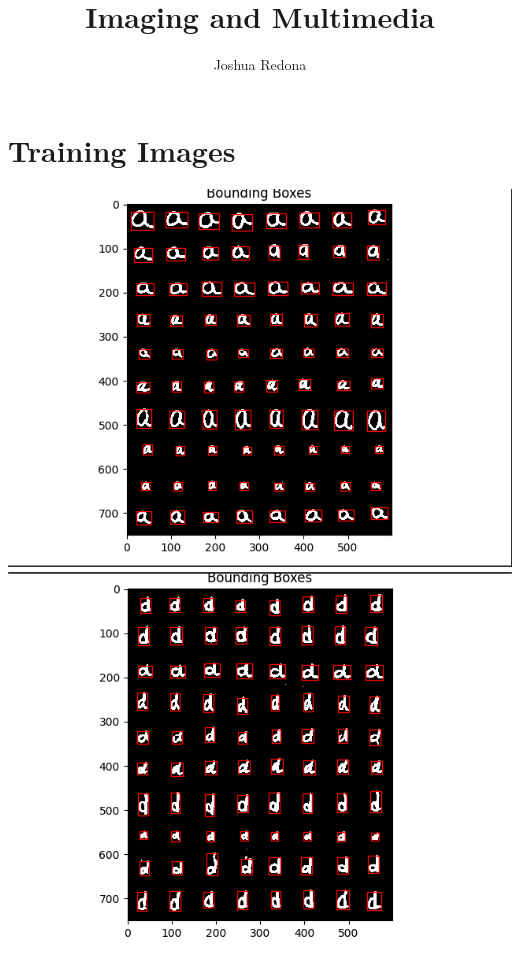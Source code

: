 \documentclass[12pt]{article}
\title{Imaging and Multimedia}
\author{Joshua Redona}
\begin{document}
\maketitle

\section*{Training Images}
\includegraphics*[scale=0.4]{aBounds} \\
\includegraphics*[scale=0.5]{dBounds} \\
\end{document}
